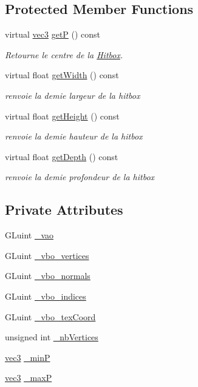 \subsection*{Protected Member Functions}
\begin{DoxyCompactItemize}
\item 
virtual \hyperlink{structvec3}{vec3} \hyperlink{class_plan_a2561b08d2e0f333c56d7ac2b5cc72fd7}{get\+P} () const 
\begin{DoxyCompactList}\small\item\em Retourne le centre de la \hyperlink{class_hitbox}{Hitbox}. \end{DoxyCompactList}\item 
virtual float \hyperlink{class_plan_aa64cc1ec4e6d1660c691592eb441e00c}{get\+Width} () const 
\begin{DoxyCompactList}\small\item\em renvoie la demie largeur de la hitbox \end{DoxyCompactList}\item 
virtual float \hyperlink{class_plan_a73316993ed03bbf13b38f2dff76b0ced}{get\+Height} () const 
\begin{DoxyCompactList}\small\item\em renvoie la demie hauteur de la hitbox \end{DoxyCompactList}\item 
virtual float \hyperlink{class_plan_a086041dcf2879904e774f34ae4ad61d7}{get\+Depth} () const 
\begin{DoxyCompactList}\small\item\em renvoie la demie profondeur de la hitbox \end{DoxyCompactList}\end{DoxyCompactItemize}
\subsection*{Private Attributes}
\begin{DoxyCompactItemize}
\item 
G\+Luint \hyperlink{class_plan_ab4efe8532b73dd0efca80000afb0027d}{\+\_\+vao}
\item 
G\+Luint \hyperlink{class_plan_a7b203dc36964da663836cf7614fe711a}{\+\_\+vbo\+\_\+vertices}
\item 
G\+Luint \hyperlink{class_plan_aa5db33661be2dfcecf68683c33eb22b9}{\+\_\+vbo\+\_\+normals}
\item 
G\+Luint \hyperlink{class_plan_ad8791ad67d66ac1b24792dc72ec00c64}{\+\_\+vbo\+\_\+indices}
\item 
G\+Luint \hyperlink{class_plan_a3c16becd29f35260b79af8b9cb6fa892}{\+\_\+vbo\+\_\+tex\+Coord}
\item 
unsigned int \hyperlink{class_plan_af3d9228c1b7dc91c0cb00d4c8fa5a550}{\+\_\+nb\+Vertices}
\item 
\hyperlink{structvec3}{vec3} \hyperlink{class_plan_aad9837a269e87fa5d7a4a5fc90abf3e7}{\+\_\+min\+P}
\item 
\hyperlink{structvec3}{vec3} \hyperlink{class_plan_a2dce54e58d00f40ed8da5c9bd34c1232}{\+\_\+max\+P}
\end{DoxyCompactItemize}
